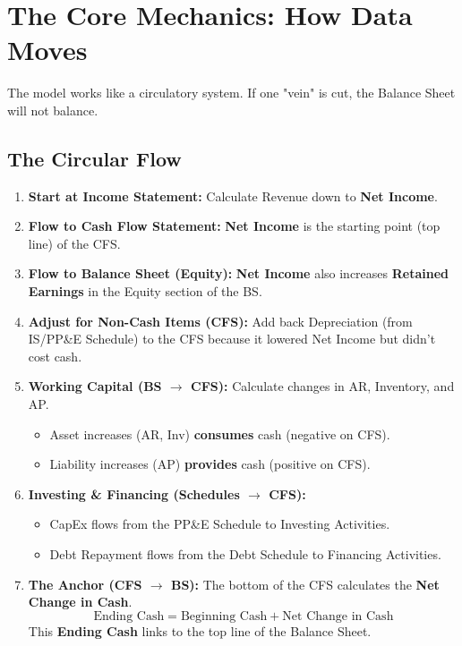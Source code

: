 \documentclass[11pt, letterpaper]{article}
\begin{document}
\newpage

\section{The Core Mechanics: How Data Moves}

The model works like a circulatory system. If one "vein" is cut, the Balance Sheet will not balance.

\subsection{The Circular Flow}
\begin{enumerate}
    \item \textbf{Start at Income Statement:} Calculate Revenue down to \textbf{Net Income}.
    \item \textbf{Flow to Cash Flow Statement:} \textbf{Net Income} is the starting point (top line) of the CFS.
    \item \textbf{Flow to Balance Sheet (Equity):} \textbf{Net Income} also increases \textbf{Retained Earnings} in the Equity section of the BS.
    \item \textbf{Adjust for Non-Cash Items (CFS):} Add back Depreciation (from IS/PP\&E Schedule) to the CFS because it lowered Net Income but didn't cost cash.
    \item \textbf{Working Capital (BS $\to$ CFS):} Calculate changes in AR, Inventory, and AP.
    \begin{itemize}
        \item Asset increases (AR, Inv) \textbf{consumes} cash (negative on CFS).
        \item Liability increases (AP) \textbf{provides} cash (positive on CFS).
    \end{itemize}
    \item \textbf{Investing \& Financing (Schedules $\to$ CFS):} 
    \begin{itemize}
        \item CapEx flows from the PP\&E Schedule to Investing Activities.
        \item Debt Repayment flows from the Debt Schedule to Financing Activities.
    \end{itemize}
    \item \textbf{The Anchor (CFS $\to$ BS):} The bottom of the CFS calculates the \textbf{Net Change in Cash}.
    \[ \text{Ending Cash} = \text{Beginning Cash} + \text{Net Change in Cash} \]
    This \textbf{Ending Cash} links to the top line of the Balance Sheet.
\end{enumerate}
\end{document}

